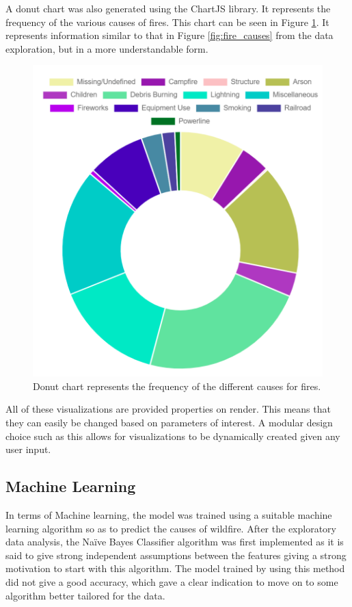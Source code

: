 \documentclass[conference]{IEEEtran}
\begin{document}
A donut chart was also generated using the ChartJS library. It represents the frequency of the various causes of fires. This chart can be seen in Figure \ref{fig:donut_chart}. It represents information similar to that in Figure \ref{fig:fire_causes} from the data exploration, but in a more understandable form. \par

\begin{figure}
    \centering
    \includegraphics[scale=0.7]{img/donut.PNG}
    \caption{Donut chart represents the frequency of the different causes for fires.}
    \label{fig:donut_chart}
\end{figure}

All of these visualizations are provided properties on render. This means that they can easily be changed based on parameters of interest. A modular design choice such as this allows for visualizations to be dynamically created given any user input. \par

\subsection{Machine Learning}
In terms of Machine learning, the model was trained using a suitable machine learning algorithm so as to predict the causes of wildfire. After the exploratory data analysis, the Naïve Bayes Classifier algorithm was first implemented as it is said to give strong independent assumptions between the features giving a strong motivation to start with this algorithm. The model trained by using this method did not give a good accuracy, which gave a clear indication to move on to some algorithm better tailored for the data. \par
\end{document}
